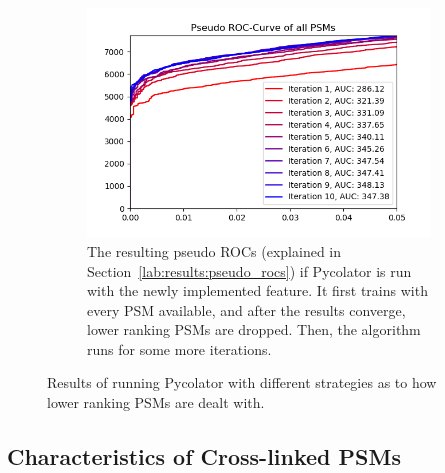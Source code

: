 \begin{figure}
\begin{subfigure}{0.49\textwidth}
		\label{fig:only_rank_one}
	\end{subfigure}
	\begin{subfigure}{0.75\textwidth}
		\includegraphics[width = \textwidth]{figures/optimalRanking.png}
		\caption[Result of the new ranking procedure]{The resulting pseudo ROCs (explained in Section~\ref{lab:results:pseudo_rocs}) if Pycolator is run with the newly implemented feature. It first trains with every PSM available, and after the results converge, lower ranking PSMs are dropped. Then, the algorithm runs for some more iterations.}
		\label{fig:optimalranking}
	\end{subfigure}
	\caption[Performance of strategies regarding different ranks]{Results of running Pycolator with different strategies as to how lower ranking PSMs are dealt with.}
	\label{fig:before_optimalranking}
\end{figure}
\renewcommand{\baselinestretch}{1}

\subsection{Characteristics of Cross-linked PSMs}
